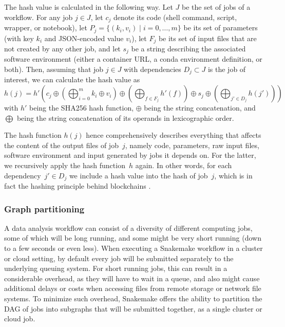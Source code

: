 \documentclass[parskip=half]{scrartcl}
\begin{document}
The hash value is calculated in the following way.
Let $J$ be the set of jobs of a workflow.
For any job $j \in J$, let $c_j$ denote its code (shell command, script, wrapper, or notebook), let $P_j = \{(k_i, v_i) \mid i=0,\dots,m\}$ be its set of parameters (with key $k_i$ and JSON-encoded value $v_i$), let $F_j$ be its set of input files that are not created by any other job, and let $s_j$ be a string describing the associated software environment (either a container URL, a conda environment definition, or both).
Then, assuming that job $j \in J$ with dependencies $D_j \subset J$ is the job of interest, we can calculate the hash value as $$ h(j) = h'\left( c_j \oplus \left(\bigoplus_{i=0}^m k_i \oplus v_i \right) \oplus \left( \bigoplus_{f \in F_j} h'(f) \right) \oplus s_j \oplus \left( \bigoplus_{j' \in D_j} h(j') \right) \right) $$ with $h'$ being the SHA256 \parencite{Handschuh} hash function, $\oplus$ being the string concatenation, and $\bigoplus$ being the string concatenation of its operands in lexicographic order.

The hash function $h(j)$ hence comprehensively describes everything that affects the content of the output files of job~\(j\), namely code, parameters, raw input files, software environment and input generated by jobs it depends on.
For the latter, we recursively apply the hash function~\(h\) again.
In other words, for each dependency~\(j' \in D_j\) we include a hash value into the hash of job~\(j\), which is in fact the hashing principle behind blockchains \parencite{narayanan_bitcoin_2016}.

\subsubsection{Graph partitioning}\label{sec:partitioning}

A data analysis workflow can consist of a diversity of different computing jobs, some of which will be long running, and some might be very short running (down to a few seconds or even less).
When executing a Snakemake workflow in a cluster or cloud setting, by default every job will be submitted separately to the underlying queuing system.
For short running jobs, this can result in a considerable overhead, as they will have to wait in a queue, and also might cause additional delays or costs when accessing files from remote storage or network file systems.
To minimize such overhead, Snakemake offers the ability to partition the DAG of jobs into subgraphs that will be submitted together, as a single cluster or cloud job.
\end{document}
